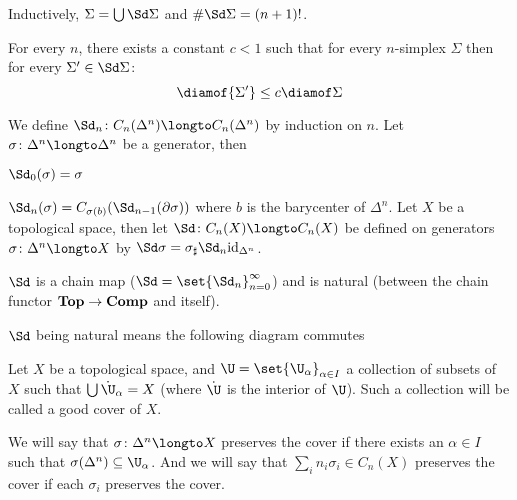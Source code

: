 \edefn

Inductively, $\Sigma=\bigcup\Sd\Sigma$ and $\#\Sd\Sigma=(n+1)!$.

\bthrm

    For every $n$, there exists a constant $c<1$ such that for every $n$-simplex $\Sigma$ then for every $\Sigma'\in\Sd\Sigma$:
    $$ \diamof{\Sigma'} \leq c\diamof\Sigma $$

\ethrm

\bdefn

    We define $\Sd_n\colon C_n(\Delta^n)\longto C_n(\Delta^n)$ by induction on $n$.
    Let $\sigma\colon\Delta^n\longto\Delta^n$ be a generator, then
    \benum
        \item $\Sd_0(\sigma)=\sigma$
        \item $\Sd_n(\sigma)=C_{\sigma(b)}(\Sd_{n-1}(\partial\sigma))$ where $b$ is the barycenter of $\Delta^n$.
    \eenum
    Let $X$ be a topological space, then let $\Sd\colon C_n(X)\longto C_n(X)$ be defined on generators $\sigma\colon\Delta^n\longto X$ by $\Sd\sigma=\sigma_\sharp\Sd_n{\rm id}_{\Delta^n}$.

\edefn

\bthrm

    $\Sd$ is a chain map ($\Sd=\set{\Sd_n}_{n=0}^\infty$) and is natural (between the chain functor ${\bf Top}\to{\bf Comp}$ and itself).

\ethrm

$\Sd$ being natural means the following diagram commutes

\bigskip
\centerline{\def\diagrowheight{1cm}}

\bdefn

    Let $X$ be a topological space, and $\U=\set{\U_\alpha}_{\alpha\in I}$ a collection of subsets of $X$ such that $\bigcup\Dot\U_\alpha=X$ (where $\Dot\U$ is the interior of $\U$).
    Such a collection will be called a {\emphcolor good cover} of $X$.

    We will say that $\sigma\colon\Delta^n\longto X$ {\emphcolor preserves} the cover if there exists an $\alpha\in I$ such that $\sigma(\Delta^n)\subseteq\U_\alpha$.
    And we will say that $\sum_in_i\sigma_i\in C_n(X)$ {\emphcolor preserves} the cover if each $\sigma_i$ preserves the cover.

